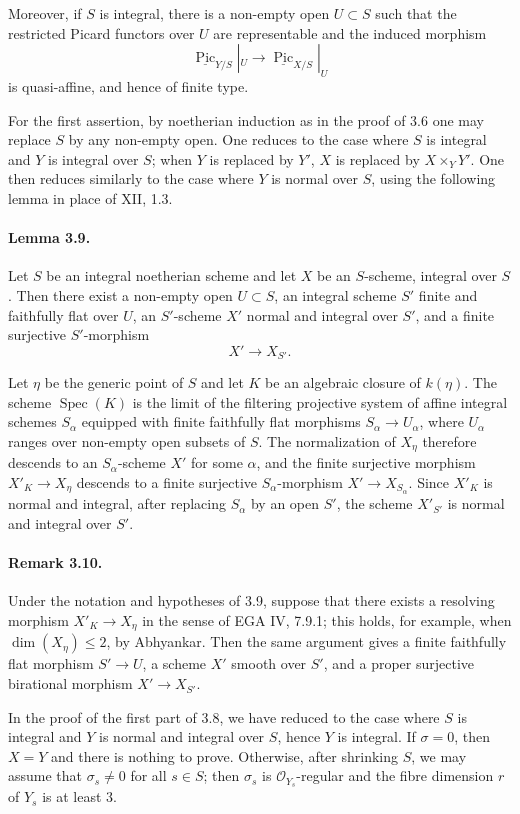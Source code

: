 \documentclass[12pt]{article}
\newcommand{\cO}{\mathcal O}
\newcommand{\Pic}{\operatorname{Pic}}
\newcommand{\Spec}{\operatorname{Spec}}
\newcommand{\longto}{\longrightarrow}
\begin{document}
Moreover, if $S$ is integral, there is a non-empty open $U\subset S$ such that the restricted Picard functors over $U$ are representable and the induced morphism
\[
\underline{\Pic}_{Y/S}|_U\longto\underline{\Pic}_{X/S}|_U
\]
is quasi-affine, and hence of finite type.

For the first assertion, by noetherian induction as in the proof of 3.6 one may replace $S$ by any non-empty open. One reduces to the case where $S$ is integral and $Y$ is integral over $S$; when $Y$ is replaced by $Y'$, $X$ is replaced by $X\times_Y Y'$. One then reduces similarly to the case where $Y$ is normal over $S$, using the following lemma in place of XII, 1.3.

\paragraph{Lemma 3.9.}
Let $S$ be an integral noetherian scheme and let $X$ be an $S$-scheme, integral over $S$. Then there exist a non-empty open $U\subset S$, an integral scheme $S'$ finite and faithfully flat over $U$, an $S'$-scheme $X'$ normal and integral over $S'$, and a finite surjective $S'$-morphism
\[
X'\longto X_{S'}.
\]

Let $\eta$ be the generic point of $S$ and let $K$ be an algebraic closure of $k(\eta)$. The scheme $\Spec(K)$ is the limit of the filtering projective system of affine integral schemes $S_\alpha$ equipped with finite faithfully flat morphisms $S_\alpha\to U_\alpha$, where $U_\alpha$ ranges over non-empty open subsets of $S$. The normalization of $X_\eta$ therefore descends to an $S_\alpha$-scheme $X'$ for some $\alpha$, and the finite surjective morphism $X'_K\to X_\eta$ descends to a finite surjective $S_\alpha$-morphism $X'\to X_{S_\alpha}$. Since $X'_K$ is normal and integral, after replacing $S_\alpha$ by an open $S'$, the scheme $X'_{S'}$ is normal and integral over $S'$.

\paragraph{Remark 3.10.}
Under the notation and hypotheses of 3.9, suppose that there exists a resolving morphism $X'_K\to X_\eta$ in the sense of EGA IV, 7.9.1; this holds, for example, when $\dim(X_\eta)\leq 2$, by Abhyankar. Then the same argument gives a finite faithfully flat morphism $S'\to U$, a scheme $X'$ smooth over $S'$, and a proper surjective birational morphism $X'\to X_{S'}$.

In the proof of the first part of 3.8, we have reduced to the case where $S$ is integral and $Y$ is normal and integral over $S$, hence $Y$ is integral. If $\sigma=0$, then $X=Y$ and there is nothing to prove. Otherwise, after shrinking $S$, we may assume that $\sigma_s\neq 0$ for all $s\in S$; then $\sigma_s$ is $\cO_{Y_s}$-regular and the fibre dimension $r$ of $Y_s$ is at least $3$.
\end{document}
